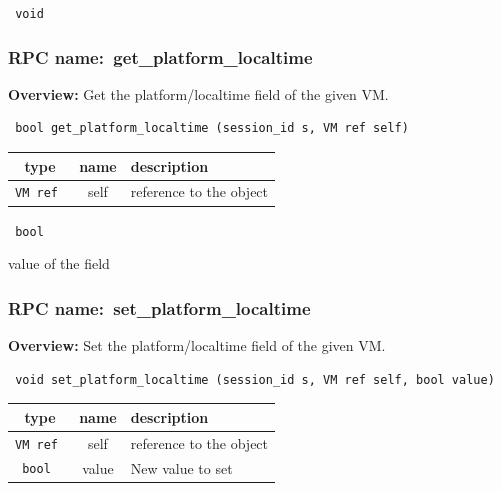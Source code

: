 \vspace{0.3cm}

{\tt 
void
}



\vspace{0.3cm}
\vspace{0.3cm}
\vspace{0.3cm}
\subsubsection{RPC name:~get\_platform\_localtime}

{\bf Overview:} 
Get the platform/localtime field of the given VM.

\begin{verbatim} bool get_platform_localtime (session_id s, VM ref self)\end{verbatim}



 
\vspace{0.3cm}
\begin{tabular}{|c|c|p{7cm}|}
 \hline
{\bf type} & {\bf name} & {\bf description} \\ \hline
{\tt VM ref } & self & reference to the object \\ \hline 

\end{tabular}

\vspace{0.3cm}

{\tt 
bool
}


value of the field
\vspace{0.3cm}
\vspace{0.3cm}
\vspace{0.3cm}
\subsubsection{RPC name:~set\_platform\_localtime}

{\bf Overview:} 
Set the platform/localtime field of the given VM.

\begin{verbatim} void set_platform_localtime (session_id s, VM ref self, bool value)\end{verbatim}



 
\vspace{0.3cm}
\begin{tabular}{|c|c|p{7cm}|}
 \hline
{\bf type} & {\bf name} & {\bf description} \\ \hline
{\tt VM ref } & self & reference to the object \\ \hline 

{\tt bool } & value & New value to set \\ \hline 

\end{tabular}

